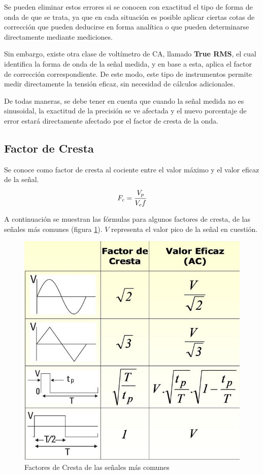 Se pueden eliminar estos errores si se conocen con exactitud el tipo de forma de onda de que se trata, ya que en cada situación es posible aplicar ciertas cotas de corrección que pueden deducirse en forma analítica o que pueden determinarse directamente mediante mediciones.

Sin embargo, existe otra clase de voltímetro de CA, llamado \textbf{True RMS}, el cual identifica la forma de onda de la señal medida, y en base a esta, aplica el factor de corrección correspondiente. De este modo, este tipo de instrumentos permite medir directamente la tensión eficaz, sin necesidad de cálculos adicionales.

De todas maneras, se debe tener en cuenta que cuando la señal medida no es sinusoidal, la exactitud de la precisión se ve afectada y el nuevo porcentaje de error estará directamente afectado por el factor de cresta de la onda.

\subsection{Factor de Cresta}

Se conoce como factor de cresta al cociente entre el valor máximo y el valor eficaz de la señal.
\begin{equation}
    F_c = \cfrac{V_p}{V_ef}
\end{equation}

A continuación se muestran las fórmulas para algunos factores de cresta, de las señales más comunes (figura \ref{fig:facCrest}). $V$ representa el valor pico de la señal en cuestión.

\begin{figure}[H]
    \centering
    \includegraphics[width=0.4\linewidth]{Imagenes/FacCrest.jpg}
    \caption{Factores de Cresta de las señales más comunes}
    \label{fig:facCrest}
\end{figure}






